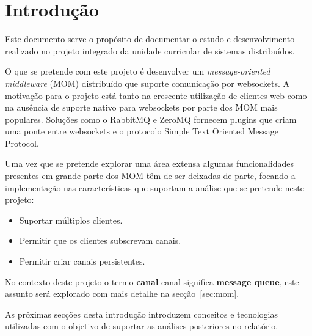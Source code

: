 \section{Introdução}

Este documento serve o propósito de documentar o estudo e desenvolvimento realizado no projeto integrado da unidade curricular de sistemas distribuídos.

O que se pretende com este projeto é desenvolver um \textit{message-oriented middleware} (MOM) distribuído que suporte comunicação por websockets. 
A motivação para o projeto está tanto na crescente utilização de clientes web como na ausência de suporte nativo para websockets por parte dos MOM mais populares. Soluções como o RabbitMQ e ZeroMQ fornecem plugins que criam uma ponte entre websockets e o protocolo Simple Text Oriented Message Protocol.

Uma vez que se pretende explorar uma área extensa algumas funcionalidades presentes em grande parte dos MOM têm de ser deixadas de parte, focando a implementação nas características que suportam a análise que se pretende neste projeto:

\begin{itemize}
\item Suportar múltiplos clientes.
\item Permitir que os clientes subscrevam canais.
\item Permitir criar canais persistentes.
\end{itemize}

No contexto deste projeto o termo \textbf{canal} canal significa \textbf{message queue}, este assunto será explorado com mais detalhe na secção~\ref{sec:mom}.


As próximas secções desta introdução introduzem conceitos e tecnologias utilizadas com o objetivo de suportar as análises posteriores no relatório.


